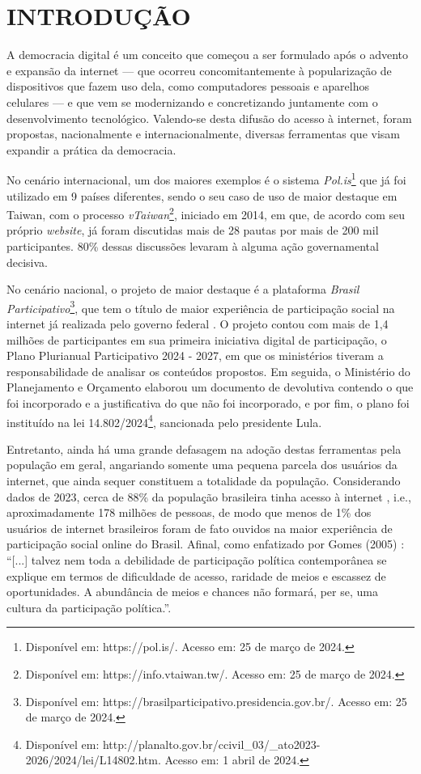 \section{INTRODUÇÃO}

A democracia digital é um conceito que começou a ser formulado após o advento e expansão da internet — que ocorreu concomitantemente à popularização de dispositivos que fazem uso dela, como computadores pessoais e aparelhos celulares —  e que vem se modernizando e concretizando juntamente com o desenvolvimento tecnológico. Valendo-se desta difusão do acesso à internet, foram propostas, nacionalmente e internacionalmente, diversas ferramentas que visam expandir a prática da democracia.

No cenário internacional, um dos maiores exemplos é o sistema \textit{Pol.is}\footnote{Disponível em: https://pol.is/. Acesso em: 25 de março de 2024.} \cite{polis} que já foi utilizado em 9 países diferentes, sendo o seu caso de uso de maior destaque em Taiwan, com o processo \textit{vTaiwan}\footnote{Disponível em: https://info.vtaiwan.tw/. Acesso em: 25 de março de 2024.}, iniciado em 2014, em que, de acordo com seu próprio \textit{website}, já foram discutidas mais de 28 pautas por mais de 200 mil participantes. 80\% dessas discussões levaram à alguma ação governamental decisiva.

No cenário nacional, o projeto de maior destaque é a plataforma \textit{Brasil Participativo}\footnote{Disponível em: https://brasilparticipativo.presidencia.gov.br/. Acesso em: 25 de março de 2024.}, que tem o título de maior experiência de participação social na internet já realizada pelo governo federal \cite{brasilParticipativo}. O projeto contou com mais de 1,4 milhões de participantes em sua primeira iniciativa digital de participação, o Plano Plurianual Participativo 2024 - 2027, em que os ministérios tiveram a responsabilidade de analisar os conteúdos propostos. Em seguida, o Ministério do Planejamento e Orçamento elaborou um documento de devolutiva contendo o que foi incorporado e a justificativa do que não foi incorporado, e por fim, o plano foi instituído na lei 14.802/2024\footnote{Disponível em: http://planalto.gov.br/ccivil\_03/\_ato2023-2026/2024/lei/L14802.htm. Acesso em: 1 abril de 2024.}, sancionada pelo presidente Lula. 

Entretanto, ainda há uma grande defasagem na adoção destas ferramentas pela população em geral, angariando somente uma pequena parcela dos usuários da internet, que ainda sequer constituem a totalidade da população. Considerando dados de 2023, cerca de 88\% da população brasileira tinha acesso à internet \cite{comInternet}, i.e., aproximadamente 178 milhões de pessoas, de modo que menos de 1\% dos usuários de internet brasileiros foram de fato ouvidos na maior experiência de participação social online do Brasil. Afinal, como enfatizado por Gomes (2005) \cite{gomes2005democracia}: \textquotedblleft[...] talvez nem toda a debilidade de participação política contemporânea se explique em termos de dificuldade de acesso, raridade de meios e escassez de oportunidades. A abundância de meios e chances não formará, per se, uma cultura da participação política.\textquotedblright.

